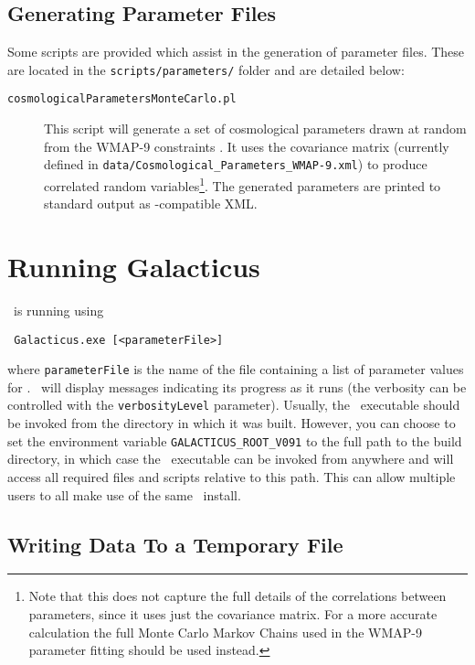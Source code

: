 \subsection{Generating Parameter Files}

Some scripts are provided which assist in the generation of parameter files. These are located in the {\tt scripts/parameters/} folder and are detailed below:
\begin{description}
\item [{\tt cosmologicalParametersMonteCarlo.pl}] This script will generate a set of cosmological parameters drawn at random from the WMAP-9 constraints \cite{hinshaw_nine-year_2012}. It uses the covariance matrix (currently defined in {\tt data/Cosmological\_Parameters\_WMAP-9.xml}) to produce correlated random variables\footnote{Note that this does not capture the full details of the correlations between parameters, since it uses just the covariance matrix. For a more accurate calculation the full Monte Carlo Markov Chains used in the WMAP-9 parameter fitting should be used instead.}. The generated parameters are printed to standard output as \glc-compatible XML.
\end{description}

\section{Running Galacticus}

\glc\ is running using
\begin{verbatim}
 Galacticus.exe [<parameterFile>]
\end{verbatim}
where {\tt parameterFile} is the name of the file containing a list of parameter values for \glc. \glc\ will display messages indicating its progress as it runs (the verbosity can be controlled with the {\tt verbosityLevel} parameter). Usually, the \glc\ executable should be invoked from the directory in which it was built. However, you can choose to set the environment variable {\tt GALACTICUS\_ROOT\_V091} to the full path to the build directory, in which case the \glc\ executable can be invoked from anywhere and will access all required files and scripts relative to this path. This can allow multiple users to all make use of the same \glc\ install.

\subsection{Writing Data To a Temporary File}

